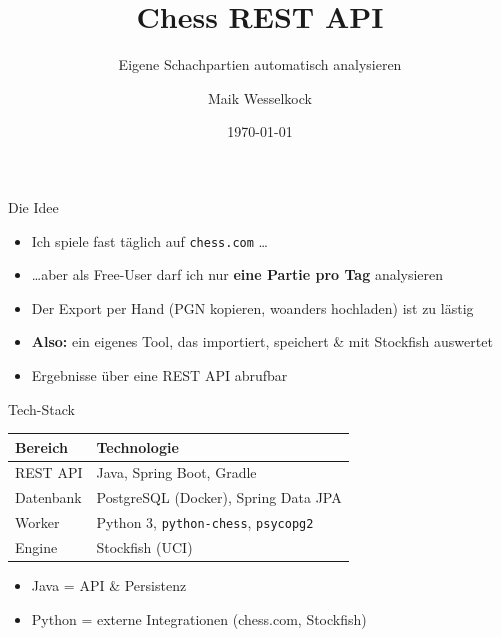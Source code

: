 \documentclass[10pt, aspectratio=169]{beamer}
\title[Chess REST API]{Chess REST API}
\subtitle{Eigene Schachpartien automatisch analysieren}
\author[Maik Wesselkock]{Maik Wesselkock}
\date{\today}
\begin{document}
\begin{frame}[plain]
  \titlepage
\end{frame}

\begin{frame}{Die Idee}
  \begin{itemize}
    \item Ich spiele fast täglich auf \texttt{chess.com} \ldots
    \item \ldots aber als \alert{Free-User} darf ich nur \textbf{eine Partie pro Tag}
          analysieren
    \item Der Export per Hand (PGN kopieren, woanders hochladen) ist zu lästig
    \item \textbf{Also:} ein eigenes Tool, das importiert, speichert \& mit Stockfish
          auswertet
    \item Ergebnisse über eine REST API abrufbar
  \end{itemize}
\end{frame}

\begin{frame}{Tech-Stack}
  \begin{center}
  \begin{tabular}{ll}
    \toprule
    \textbf{Bereich} & \textbf{Technologie} \\
    \midrule
    REST API & Java, Spring Boot, Gradle \\
    Datenbank & PostgreSQL (Docker), Spring Data JPA \\
    Worker & Python 3, \texttt{python-chess}, \texttt{psycopg2} \\
    Engine & Stockfish (UCI) \\
    \bottomrule
  \end{tabular}
  \end{center}

  \vspace{1.2em}
  \begin{itemize}
    \item Java = API \& Persistenz
    \item Python = externe Integrationen (chess.com, Stockfish)
  \end{itemize}
\end{frame}
\end{document}
